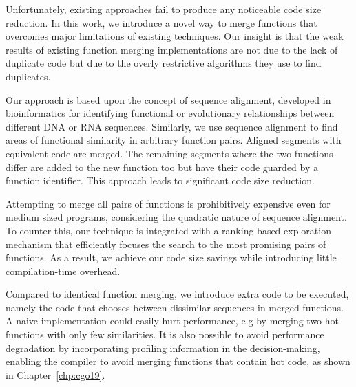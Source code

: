 Unfortunately, existing approaches fail  to produce any noticeable code size reduction.
In this work, we introduce a novel way to merge functions that overcomes major limitations of existing techniques.
Our insight is that the weak results of existing function merging implementations are not due to the lack of duplicate code but due to the %
overly restrictive algorithms they use to find duplicates.


Our approach is based upon the concept of sequence alignment, developed in bioinformatics for identifying functional or evolutionary relationships between different DNA or RNA sequences.
Similarly, we use sequence alignment to find areas of functional similarity in arbitrary function pairs.
Aligned segments with equivalent code are merged.
The remaining segments where the two functions differ are added to the new function too but have their code guarded by a function identifier.
This approach leads to significant code size reduction.

Attempting to merge all pairs of functions is prohibitively expensive even for medium sized programs, considering the quadratic nature of sequence alignment.
To counter this, our technique is integrated with a ranking-based exploration mechanism that efficiently focuses the search to the most
promising pairs of functions. %
As a result, we achieve our code size savings while introducing little compilation-time
overhead.

Compared to identical function merging, we introduce extra code to be executed,
namely the code that chooses between dissimilar sequences in merged functions.
A naive implementation could easily hurt performance, e.g by merging two hot functions
with only few similarities. It is also possible to avoid performance degradation by incorporating
profiling information in the decision-making, enabling the compiler to avoid merging functions that contain hot code, as shown in Chapter~\ref{chp:cgo19}.

